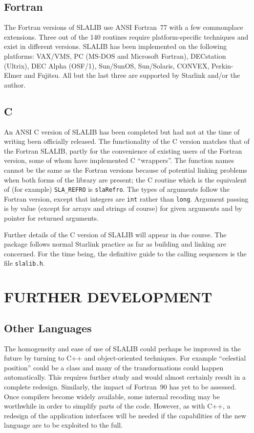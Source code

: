 \subsection{Fortran}
The Fortran versions of SLALIB use ANSI Fortran~77 with a few
commonplace extensions.  Three out of the 140 routines require
platform-specific techniques and exist in different versions.
SLALIB has been implemented on the following platforms:
VAX/VMS,
PC (MS-DOS and Microsoft Fortran),
DECstation (Ultrix),
DEC Alpha (OSF/1),
Sun/SunOS,
Sun/Solaris,
CONVEX,
Perkin-Elmer and
Fujitsu.  All but the last three are supported by Starlink
and/or the author.

\subsection{C}
An ANSI C version of SLALIB has been completed but had not at the
time of writing been officially released.
The functionality of the C version matches
that of the Fortran SLALIB, partly for the convenience of
existing users of the Fortran version, some of whom have
implemented C ``wrappers''.  The function names
cannot be the same as the Fortran versions because of potential
linking problems when
both forms of the library are present; the C routine which
is the equivalent of (for example) \verb|SLA_REFRO| is \verb|slaRefro|.
The types of arguments follow the Fortran version, except
that integers are \verb|int| rather than \verb|long|.
Argument passing is by value
(except for arrays and strings of course)
for given arguments and by pointer for returned arguments.

Further details of the C version of SLALIB will appear in due course.
The package follows normal Starlink practice as far as building
and linking are concerned.  For the time being, the definitive guide to
the calling sequences is the file \verb|slalib.h|.

\section{FURTHER DEVELOPMENT}

\subsection{Other Languages}
The homogeneity and ease of use of SLALIB could perhaps be improved
in the future
by turning to C++ and object-oriented techniques.  For example ``celestial
position'' could be a class and many of the transformations
could happen automatically.  This requires further study and
would almost certainly result in a complete redesign.
Similarly,
the impact of Fortran~90 has yet to be assessed.  Once compilers
become widely available, some internal recoding may be worthwhile
in order to simplify parts of the code.  However, as with C++,
a redesign of the
application interfaces will be needed if the capabilities of the
new language are to be exploited to the full.

